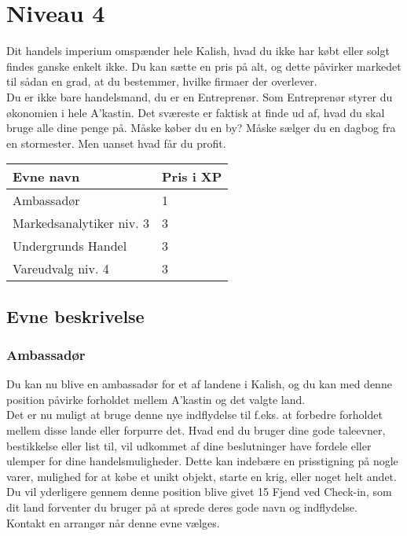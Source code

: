 \chapter{Niveau 4}
Dit handels imperium omspænder hele Kalish, hvad du ikke har købt eller solgt findes ganske enkelt ikke. Du kan sætte en pris på alt, og dette påvirker markedet til sådan en grad, at du bestemmer, hvilke firmaer der overlever.\\
Du er ikke bare handelsmand, du er en Entreprenør. Som Entreprenør styrer du økonomien i hele A'kastin. Det sværeste er faktisk at finde ud af, hvad du skal bruge alle dine penge på. Måske køber du en by? Måske sælger du en dagbog fra en stormester. Men uanset hvad får du profit.\\


\begin{table}[H]
    \centering
    \begin{tabular}{|p{}|p{}|}
    \rowcolor{cerulean!80}\hline
        Evne navn & Pris i XP \\\hline
        Ambassadør & 1\\\hline
        Markedsanalytiker niv. 3 & 3\\\hline
        Undergrunds Handel & 3\\\hline
        Vareudvalg niv. 4 & 3\\\hline
    \end{tabular}
\end{table}


\section{Evne beskrivelse}

\subsection{Ambassadør}
Du kan nu blive en ambassadør for et af landene i Kalish, og du kan med denne position påvirke forholdet mellem A'kastin og det valgte land.\\
Det er nu muligt at bruge denne nye indflydelse til f.eks. at forbedre forholdet mellem disse lande eller forpurre det. Hvad end du bruger dine gode taleevner, bestikkelse eller list til, vil udkommet af dine beslutninger have fordele eller ulemper for dine handelsmuligheder. Dette kan indebære en prisstigning på nogle varer, mulighed for at købe et unikt objekt, starte en krig, eller noget helt andet.\\
Du vil yderligere gennem denne position blive givet 15 Fjend ved Check-in, som dit land forventer du bruger på at sprede deres gode navn og indflydelse.\\
Kontakt en arrangør når denne evne vælges.\\

